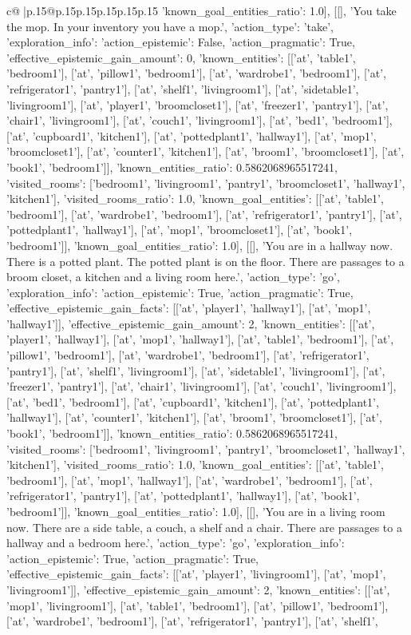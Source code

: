 \documentclass{article}
\begin{document}
{\begin{supertabular}{c@{$\;$}|p{.15\linewidth}@{}p{.15\linewidth}p{.15\linewidth}p{.15\linewidth}p{.15\linewidth}p{.15\linewidth}}
{{{'known_goal_entities_ratio': 1.0}}], [[], 'You take the mop. In your inventory you have a mop.', {'action_type': 'take', 'exploration_info': {'action_epistemic': False, 'action_pragmatic': True, 'effective_epistemic_gain_amount': 0, 'known_entities': [['at', 'table1', 'bedroom1'], ['at', 'pillow1', 'bedroom1'], ['at', 'wardrobe1', 'bedroom1'], ['at', 'refrigerator1', 'pantry1'], ['at', 'shelf1', 'livingroom1'], ['at', 'sidetable1', 'livingroom1'], ['at', 'player1', 'broomcloset1'], ['at', 'freezer1', 'pantry1'], ['at', 'chair1', 'livingroom1'], ['at', 'couch1', 'livingroom1'], ['at', 'bed1', 'bedroom1'], ['at', 'cupboard1', 'kitchen1'], ['at', 'pottedplant1', 'hallway1'], ['at', 'mop1', 'broomcloset1'], ['at', 'counter1', 'kitchen1'], ['at', 'broom1', 'broomcloset1'], ['at', 'book1', 'bedroom1']], 'known_entities_ratio': 0.5862068965517241, 'visited_rooms': ['bedroom1', 'livingroom1', 'pantry1', 'broomcloset1', 'hallway1', 'kitchen1'], 'visited_rooms_ratio': 1.0, 'known_goal_entities': [['at', 'table1', 'bedroom1'], ['at', 'wardrobe1', 'bedroom1'], ['at', 'refrigerator1', 'pantry1'], ['at', 'pottedplant1', 'hallway1'], ['at', 'mop1', 'broomcloset1'], ['at', 'book1', 'bedroom1']], 'known_goal_entities_ratio': 1.0}}], [[], 'You are in a hallway now. There is a potted plant. The potted plant is on the floor. There are passages to a broom closet, a kitchen and a living room here.', {'action_type': 'go', 'exploration_info': {'action_epistemic': True, 'action_pragmatic': True, 'effective_epistemic_gain_facts': [['at', 'player1', 'hallway1'], ['at', 'mop1', 'hallway1']], 'effective_epistemic_gain_amount': 2, 'known_entities': [['at', 'player1', 'hallway1'], ['at', 'mop1', 'hallway1'], ['at', 'table1', 'bedroom1'], ['at', 'pillow1', 'bedroom1'], ['at', 'wardrobe1', 'bedroom1'], ['at', 'refrigerator1', 'pantry1'], ['at', 'shelf1', 'livingroom1'], ['at', 'sidetable1', 'livingroom1'], ['at', 'freezer1', 'pantry1'], ['at', 'chair1', 'livingroom1'], ['at', 'couch1', 'livingroom1'], ['at', 'bed1', 'bedroom1'], ['at', 'cupboard1', 'kitchen1'], ['at', 'pottedplant1', 'hallway1'], ['at', 'counter1', 'kitchen1'], ['at', 'broom1', 'broomcloset1'], ['at', 'book1', 'bedroom1']], 'known_entities_ratio': 0.5862068965517241, 'visited_rooms': ['bedroom1', 'livingroom1', 'pantry1', 'broomcloset1', 'hallway1', 'kitchen1'], 'visited_rooms_ratio': 1.0, 'known_goal_entities': [['at', 'table1', 'bedroom1'], ['at', 'mop1', 'hallway1'], ['at', 'wardrobe1', 'bedroom1'], ['at', 'refrigerator1', 'pantry1'], ['at', 'pottedplant1', 'hallway1'], ['at', 'book1', 'bedroom1']], 'known_goal_entities_ratio': 1.0}}], [[], 'You are in a living room now. There are a side table, a couch, a shelf and a chair. There are passages to a hallway and a bedroom here.', {'action_type': 'go', 'exploration_info': {'action_epistemic': True, 'action_pragmatic': True, 'effective_epistemic_gain_facts': [['at', 'player1', 'livingroom1'], ['at', 'mop1', 'livingroom1']], 'effective_epistemic_gain_amount': 2, 'known_entities': [['at', 'mop1', 'livingroom1'], ['at', 'table1', 'bedroom1'], ['at', 'pillow1', 'bedroom1'], ['at', 'wardrobe1', 'bedroom1'], ['at', 'refrigerator1', 'pantry1'], ['at', 'shelf1', }}}
\end{supertabular}}
\end{document}
